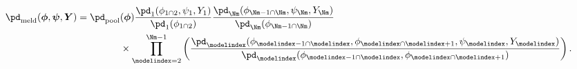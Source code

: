 \begin{equation}
  \begin{aligned}
  \pd_{\text{meld}} (\boldsymbol{\phi}, \boldsymbol{\psi}, \boldsymbol{Y}) =
    \pd_{\text{pool}}&(\boldsymbol{\phi})
    \frac {
      \pd_{1} (\phi_{1 \cap 2}, \psi_{1}, Y_{1})
    } {
      \pd_{1}(\phi_{1 \cap 2})
    }
    \frac {
      \pd_{\Nm} (\phi_{\Nm - 1 \cap \Nm}, \psi_{\Nm}, Y_{\Nm})
    } {
      \pd_{\Nm}(\phi_{\Nm - 1 \cap \Nm})
    } \\
    &\times \prod_{\modelindex = 2}^{\Nm - 1} \left(
      \frac {
        \pd_{\modelindex} (\phi_{\modelindex - 1 \cap \modelindex}, \phi_{\modelindex \cap \modelindex + 1}, \psi_{\modelindex}, Y_{\modelindex})
      } {
        \pd_{\modelindex}(\phi_{\modelindex - 1 \cap \modelindex}, \phi_{\modelindex \cap \modelindex + 1})
      }
    \right).
  \end{aligned}
  \label{eqn:melded-model-general}
\end{equation}